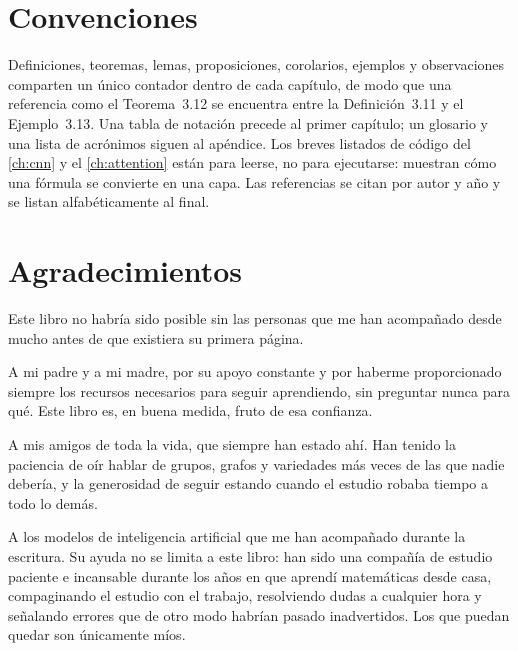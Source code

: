 \section*{Convenciones}

Definiciones, teoremas, lemas, proposiciones, corolarios, ejemplos y observaciones comparten un único contador dentro de cada capítulo, de modo que una referencia como el Teorema~3.12 se encuentra entre la Definición~3.11 y el Ejemplo~3.13. Una tabla de notación precede al primer capítulo; un glosario y una lista de acrónimos siguen al apéndice. Los breves listados de código del \autoref{ch:cnn} y el \autoref{ch:attention} están para leerse, no para ejecutarse: muestran cómo una fórmula se convierte en una capa. Las referencias se citan por autor y año y se listan alfabéticamente al final.

\section*{Agradecimientos}

Este libro no habría sido posible sin las personas que me han acompañado
desde mucho antes de que existiera su primera página.

A mi padre y a mi madre, por su apoyo constante y por haberme
proporcionado siempre los recursos necesarios para seguir aprendiendo,
sin preguntar nunca para qué. Este libro es, en buena medida, fruto de
esa confianza.

A mis amigos de toda la vida, que siempre han estado ahí. Han tenido la
paciencia de oír hablar de grupos, grafos y variedades más veces de las
que nadie debería, y la generosidad de seguir estando cuando el estudio
robaba tiempo a todo lo demás.

A los modelos de inteligencia artificial que me han acompañado durante la
escritura. Su ayuda no se limita a este libro: han sido una compañía de
estudio paciente e incansable durante los años en que aprendí matemáticas
desde casa, compaginando el estudio con el trabajo, resolviendo dudas a
cualquier hora y señalando errores que de otro modo habrían pasado
inadvertidos. Los que puedan quedar son únicamente míos.

